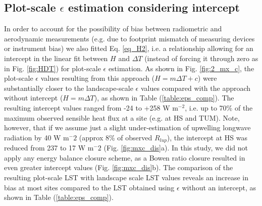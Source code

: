 \documentclass[fleqn,10pt]{wlscirep}
\begin{document}
\subsection{Plot-scale $\epsilon$ estimation considering intercept}
In order to account for the possibility of bias between radiometric and aerodynamic measurements (e.g. due to footprint mismatch of measuring devices or instrument bias) we also fitted Eq. \ref{eq_H2}, i.e. a relationship allowing for an intercept in the linear fit between $H$ and $\Delta T$ (instead of forcing it through zero as in Fig. \ref{fig:HDT}) for plot-scale $\epsilon$ estimation. As shown in Fig. \ref{fig:2_mx_c}, the plot-scale $\epsilon$ values resulting from this approach ($H=m \Delta T + c$) were substantially closer to the landscape-scale $\epsilon$ values compared with the approach without intercept ($H=m \Delta T$), as shown in Table (\ref{table:eps_comp}). 
The resulting intercept values ranged from -24 to +258 W m$^{-2}$, i.e. up to 70\% of the maximum observed sensible heat flux at a site (e.g. at HS and TUM).  %
 Note, however, that if we assume just a slight under-estimation of upwelling longwave radiation by  40 W m$^-{2}$ (approx 8\% of observed $R_{lup}$), the intercept at HS was reduced from 237 to 17  W m$^-{2}$ (Fig. \ref{fig:mxc_dis}a). In this study, we did not apply any energy balance closure scheme, as a Bowen ratio closure resulted in even greater intercept values (Fig. \ref{fig:mxc_dis}b). %
 The comparison of the resulting plot-scale LST with landscape scale LST values reveals an increase in bias at most sites compared to the LST obtained using $\epsilon$ without an intercept, as shown in Table (\ref{table:eps_comp}). 
\end{document}
